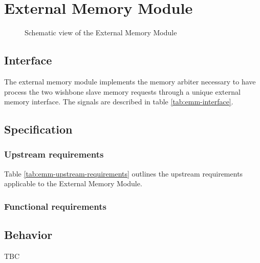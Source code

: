 \section{External Memory Module}

  \begin{figure}[h!]
      \centering
      
      \caption{Schematic view of the External Memory Module}
      \label{fig:emm}
    \end{figure}

  \subsection{Interface}

    \begin{content}
        The external memory module implements the memory arbiter necessary to have process the two wishbone slave memory requests through a unique external memory interface. The signals are described in table \ref{tab:emm-interface}. 
      \end{content}

    

  \subsection{Specification}

    \subsubsection{Upstream requirements}

      Table \ref{tab:emm-upstream-requirements} outlines the upstream requirements applicable to the External Memory Module.

      

    \subsubsection{Functional requirements}

  \subsection{Behavior}

    \begin{content}
        TBC
      \end{content}

\newpage
